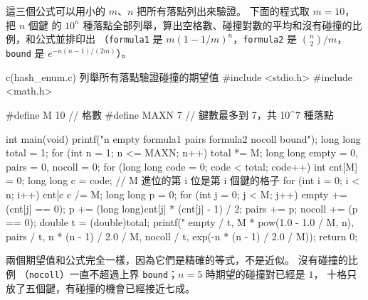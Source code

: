 這三個公式可以用小的 $m$、$n$ 把所有落點列出來驗證。 下面的程式取 $m = 10$，把 $n$ 個鍵
的 $10^n$ 種落點全部列舉，算出空格數、碰撞對數的平均和沒有碰撞的比例，和公式並排印出
（\texttt{formula1} 是 $m(1-1/m)^n$，\texttt{formula2} 是 $\binom{n}{2}/m$，
\texttt{bound} 是 $e^{-n(n-1)/(2m)}$）。

\begin{example}[label=ex:mth-hash-enum]{c}{(hash\_enum.c) 列舉所有落點驗證碰撞的期望值}
#include <stdio.h>
#include <math.h>

#define M 10                    // 格數
#define MAXN 7                  // 鍵數最多到 7，共 10^7 種落點

int main(void)
{
    printf("n empty formula1 pairs formula2 nocoll bound\n");
    long long total = 1;
    for (int n = 1; n <= MAXN; n++) {
        total *= M;
        long long empty = 0, pairs = 0, nocoll = 0;
        for (long long code = 0; code < total; code++) {
            int cnt[M] = {0};
            long long c = code;
            // M 進位的第 i 位是第 i 個鍵的格子
            for (int i = 0; i < n; i++) {
                cnt[c %
                c /= M;
            }
            long long p = 0;
            for (int j = 0; j < M; j++) {
                empty += (cnt[j] == 0);
                p += (long long)cnt[j] * (cnt[j] - 1) / 2;
            }
            pairs += p;
            nocoll += (p == 0);
        }
        double t = (double)total;
        printf("%
               empty / t, M * pow(1.0 - 1.0 / M, n),
               pairs / t, n * (n - 1) / 2.0 / M,
               nocoll / t, exp(-n * (n - 1) / 2.0 / M));
    }
    return 0;
}
\end{example}

兩個期望值和公式完全一樣，因為它們是精確的等式，不是近似。 沒有碰撞的比例
（\texttt{nocoll}）一直不超過上界 \texttt{bound}；$n = 5$ 時期望的碰撞對已經是 $1$，
十格只放了五個鍵，有碰撞的機會已經接近七成。

